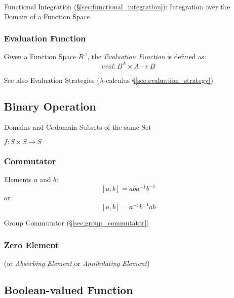 \fist Functional Integration (\S\ref{sec:functional_integration}): Integration
over the Domain of a Function Space



\subsubsection{Evaluation Function}\label{sec:evaluation_function}

Given a Function Space $B^A$, the \emph{Evaluation Function} is
defined as:
\[
  eval : B^A \times A \rightarrow B
\]

\fist See also Evaluation Strategies ($\lambda$-calculus
\S\ref{sec:evaluation_strategy})



\subsection{Binary Operation}\label{sec:binary_operation}

Domains and Codomain Subsets of the same Set

$f : S \times S \rightarrow S$



\subsubsection{Commutator}\label{sec:commutator}

Elements $a$ and $b$:
\[
  [a,b] = aba^{-1}b^{-1}
\]
or:
\[
  [a,b] = a^{-1}b^{-1}ab
\]

Group Commutator (\S\ref{sec:group_commutator})



\subsubsection{Zero Element}\label{sec:zero_element}

(or \emph{Absorbing Element} or \emph{Annihilating Element})



\subsection{Boolean-valued Function}\label{sec:boolean_function}


